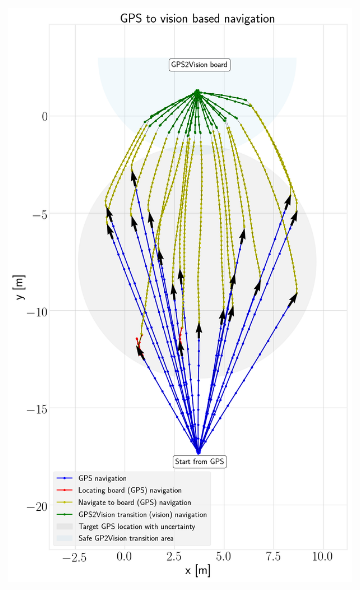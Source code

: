 \documentclass[../Head/report.tex]{subfiles}
\begin{document}
\begin{figure}[H]
    \centering
    \begin{subfigure}[t]{.45\textwidth}
        \centering
        \includegraphics[width=\textwidth]{../Figures/GPS2Vision/test1_noWind_20_runs/gps2vision.png}
        \caption{}
        \label{fig:GPS2Vision_test1}
    \end{subfigure}
     \hspace{0.2em}
    \begin{subfigure}[t]{.45\textwidth}
        \centering

\end{subfigure}
\end{figure}
\end{document}
